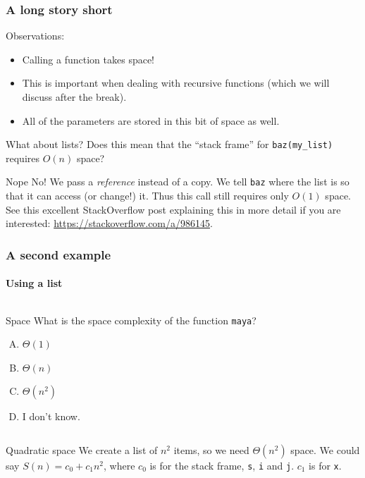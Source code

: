 \begin{frame}
	\frametitle{A long story short}
	
	Observations:
	\begin{itemize}
		\item Calling a function takes space!
		\item This is important when dealing with recursive functions (which we will discuss after the break).
		\item All of the parameters are stored in this bit of space as well.
	\end{itemize}
	\pause
	\begin{block}{What about lists?}
		Does this mean that the ``stack frame'' for \texttt{baz(my\_list)} requires $O(n)$ space?
	\end{block}
	\pause
	\begin{block}{Nope}
		No! We pass a \textit{reference} instead of a copy. We tell \texttt{baz} where the list is so that it can
		access (or change!) it. Thus this call still requires only $O(1)$ space.\\

		{\scriptsize
		See this excellent StackOverflow post explaining this in more detail if you are interested:
	\url{https://stackoverflow.com/a/986145}.}
	\end{block}
\end{frame}

\begin{frame}
	\frametitle{A second example}
	\framesubtitle{Using a list}
	
	\begin{columns}
		
		\pause
		\begin{block}{Space}
			What is the space complexity of the function \texttt{maya}?
			\begin{enumerate}[A.]
				\item $\Theta(1)$
				\item $\Theta(n)$ 
				\item $\Theta(n^2)$
				\item I don't know.
			\end{enumerate}
		\end{block}
	\end{columns}
	\pause
	\begin{block}{Quadratic space}
		We create a list of $n^2$ items, so we need $\Theta(n^2)$ space. We could say $S(n) = c_0 + c_1n^2$, where $c_0$ is
		for the stack frame, \texttt{s}, \texttt{i} and \texttt{j}. $c_1$ is for \texttt{x}.
	\end{block}
\end{frame}

